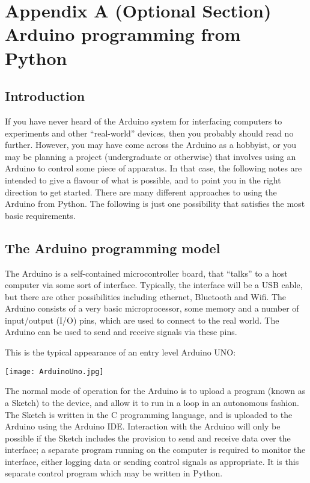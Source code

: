 \documentclass[10pt]{article}
\begin{document}
    \hypertarget{appendix-a-optional-section-arduino-programming-from-python}{%
\section*{Appendix A (Optional Section) Arduino programming from
Python}\label{appendix-a-optional-section-arduino-programming-from-python}}
\hypertarget{a.1-introduction}{%
\renewcommand{\thesubsection}{A.\arabic{subsection}}
\subsection{Introduction}\label{a.1-introduction}}

If you have never heard of the Arduino system for interfacing computers
to experiments and other ``real-world'' devices, then you probably
should read no further. However, you may have come across the Arduino as
a hobbyist, or you may be planning a project (undergraduate or
otherwise) that involves using an Arduino to control some piece of
apparatus. In that case, the following notes are intended to give a
flavour of what is possible, and to point you in the right direction to
get started. There are many different approaches to using the Arduino
from Python. The following is just one possibility that satisfies the
most basic requirements.

    \hypertarget{a.2-the-arduino-programming-model}{%
\subsection{The Arduino programming
model}\label{a.2-the-arduino-programming-model}}

The Arduino is a self-contained microcontroller board, that ``talks'' to
a host computer via some sort of interface. Typically, the interface
will be a USB cable, but there are other possibilities including
ethernet, Bluetooth and Wifi. The Arduino consists of a very basic
microprocessor, some memory and a number of input/output (I/O) pins,
which are used to connect to the real world. The Arduino can be used to
send and receive signals via these pins.

This is the typical appearance of an entry level Arduino UNO:

\texttt{[image: ArduinoUno.jpg]}

The normal mode of operation for the Arduino is to upload a program
(known as a Sketch) to the device, and allow it to run in a loop in an
autonomous fashion. The Sketch is written in the C programming language,
and is uploaded to the Arduino using the Arduino IDE. Interaction with
the Arduino will only be possible if the Sketch includes the provision
to send and receive data over the interface; a separate program running
on the computer is required to monitor the interface, either logging
data or sending control signals as appropriate. It is this separate
control program which may be written in Python.
\end{document}
